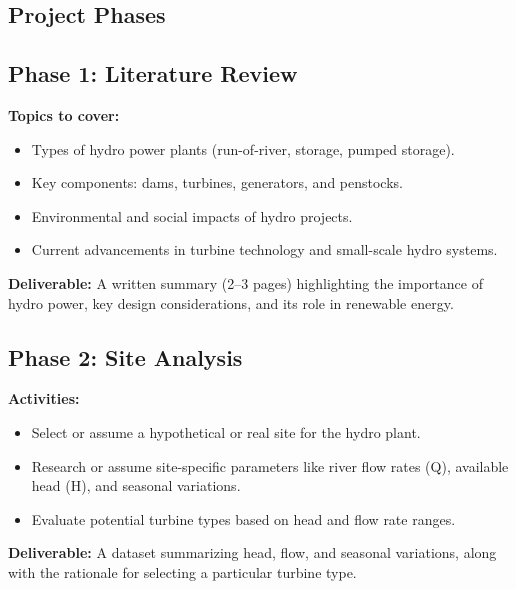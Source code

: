 \documentclass[11pt]{article}
\begin{document}
\subsection{Project Phases}

\subsection*{Phase 1: Literature Review}
\textbf{Topics to cover:}
\begin{itemize}
    \item Types of hydro power plants (run-of-river, storage, pumped storage).
    \item Key components: dams, turbines, generators, and penstocks.
    \item Environmental and social impacts of hydro projects.
    \item Current advancements in turbine technology and small-scale hydro systems.
\end{itemize}
\textbf{Deliverable:} A written summary (2--3 pages) highlighting the importance of hydro power, key design considerations, and its role in renewable energy.

\subsection*{Phase 2: Site Analysis}
\textbf{Activities:}
\begin{itemize}
    \item Select or assume a hypothetical or real site for the hydro plant.
    \item Research or assume site-specific parameters like river flow rates (Q), available head (H), and seasonal variations.
    \item Evaluate potential turbine types based on head and flow rate ranges.
\end{itemize}
\textbf{Deliverable:} A dataset summarizing head, flow, and seasonal variations, along with the rationale for selecting a particular turbine type.
\end{document}
